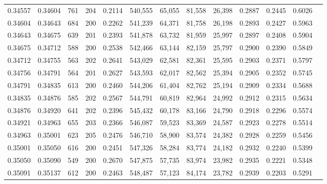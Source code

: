 \begin{tabular}{rrrrrrrrrrrrr}
0.34557 & 0.34604 &   761 & 204 &                                     0.2114 & 540,555 &  65,055 &  81,558 &  26,398 & 0.2887 & 0.2445 & 0.6026 \\
0.34604 & 0.34643 &   684 & 200 &                                     0.2262 & 541,239 &  64,371 &  81,758 &  26,198 & 0.2893 & 0.2427 & 0.5963 \\
0.34643 & 0.34675 &   639 & 201 &                                     0.2393 & 541,878 &  63,732 &  81,959 &  25,997 & 0.2897 & 0.2408 & 0.5904 \\
0.34675 & 0.34712 &   588 & 200 &                                     0.2538 & 542,466 &  63,144 &  82,159 &  25,797 & 0.2900 & 0.2390 & 0.5849 \\
0.34712 & 0.34755 &   563 & 202 &                                     0.2641 & 543,029 &  62,581 &  82,361 &  25,595 & 0.2903 & 0.2371 & 0.5797 \\
0.34756 & 0.34791 &   564 & 201 &                                     0.2627 & 543,593 &  62,017 &  82,562 &  25,394 & 0.2905 & 0.2352 & 0.5745 \\
0.34791 & 0.34835 &   613 & 200 &                                     0.2460 & 544,206 &  61,404 &  82,762 &  25,194 & 0.2909 & 0.2334 & 0.5688 \\
0.34835 & 0.34876 &   585 & 202 &                                     0.2567 & 544,791 &  60,819 &  82,964 &  24,992 & 0.2912 & 0.2315 & 0.5634 \\
0.34876 & 0.34920 &   641 & 202 &                                     0.2396 & 545,432 &  60,178 &  83,166 &  24,790 & 0.2918 & 0.2296 & 0.5574 \\
0.34921 & 0.34963 &   655 & 203 &                                     0.2366 & 546,087 &  59,523 &  83,369 &  24,587 & 0.2923 & 0.2278 & 0.5514 \\
0.34963 & 0.35001 &   623 & 205 &                                     0.2476 & 546,710 &  58,900 &  83,574 &  24,382 & 0.2928 & 0.2259 & 0.5456 \\
0.35001 & 0.35050 &   616 & 200 &                                     0.2451 & 547,326 &  58,284 &  83,774 &  24,182 & 0.2932 & 0.2240 & 0.5399 \\
0.35050 & 0.35090 &   549 & 200 &                                     0.2670 & 547,875 &  57,735 &  83,974 &  23,982 & 0.2935 & 0.2221 & 0.5348 \\
0.35091 & 0.35137 &   612 & 200 &                                     0.2463 & 548,487 &  57,123 &  84,174 &  23,782 & 0.2939 & 0.2203 & 0.5291 \\

\end{tabular}
